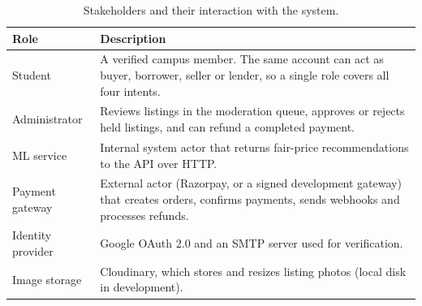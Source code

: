 \documentclass[12pt,letterpaper,twoside,openany]{report}
\begin{document}
\begin{table}[H]
\centering
\caption{Stakeholders and their interaction with the system.}\label{tab:stake}
\small
\begin{tabularx}{\textwidth}{@{}L{2.6cm}X@{}}
\toprule
\textbf{Role} & \textbf{Description}\\
\midrule
Student & A verified campus member. The same account can act as buyer, borrower, seller or
lender, so a single role covers all four intents.\\
Administrator & Reviews listings in the moderation queue, approves or rejects held listings, and
can refund a completed payment.\\
ML service & Internal system actor that returns fair-price recommendations to the API over HTTP.\\
Payment gateway & External actor (Razorpay, or a signed development gateway) that creates orders,
confirms payments, sends webhooks and processes refunds.\\
Identity provider & Google OAuth 2.0 and an SMTP server used for verification.\\
Image storage & Cloudinary, which stores and resizes listing photos (local disk in development).\\
\bottomrule
\end{tabularx}
\end{table}
\end{document}
